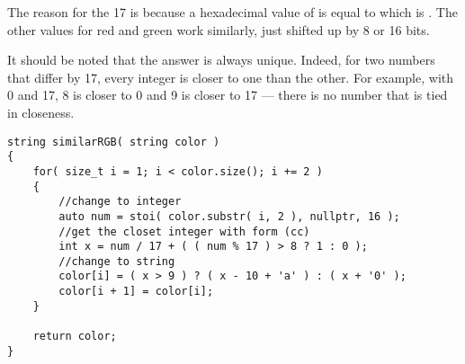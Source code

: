 The reason for the 17 is because a hexadecimal value of  is equal to  which is . The other values for red and green work similarly, just shifted up by 8 or 16 bits.

It should be noted that the answer is always unique. Indeed, for two numbers that differ by 17, every integer is closer to one than the other. For example, with 0 and 17, 8 is closer to 0 and 9 is closer to 17 --- there is no number that is tied in closeness.

\setcounter{lstlisting}{0}
\begin{lstlisting}[style=customc, caption={Brute Force}]
string similarRGB( string color )
{
    for( size_t i = 1; i < color.size(); i += 2 )
    {
        //change to integer
        auto num = stoi( color.substr( i, 2 ), nullptr, 16 );
        //get the closet integer with form (cc)
        int x = num / 17 + ( ( num % 17 ) > 8 ? 1 : 0 );
        //change to string
        color[i] = ( x > 9 ) ? ( x - 10 + 'a' ) : ( x + '0' );
        color[i + 1] = color[i];
    }

    return color;
}
\end{lstlisting}